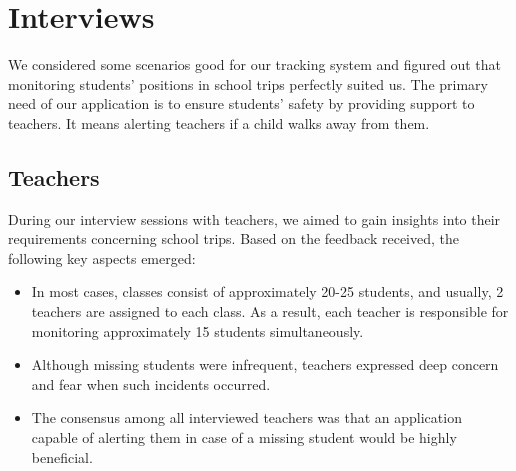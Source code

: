 \section{Interviews}
We considered some scenarios good for our tracking system and figured out that monitoring students' positions in school trips perfectly suited us. The primary need of our application is to ensure students' safety by providing support to teachers. It means alerting teachers if a child walks away from them.

\subsection{Teachers}
During our interview sessions with teachers, we aimed to gain insights into their requirements concerning school trips. Based on the feedback received, the following key aspects emerged:
\begin{itemize}
\item In most cases, classes consist of approximately 20-25 students, and usually, 2 teachers are assigned to each class. As a result, each teacher is responsible for monitoring approximately 15 students simultaneously.
\item Although missing students were infrequent, teachers expressed deep concern and fear when such incidents occurred.
\item The consensus among all interviewed teachers was that an application capable of alerting them in case of a missing student would be highly beneficial.
\end{itemize}

